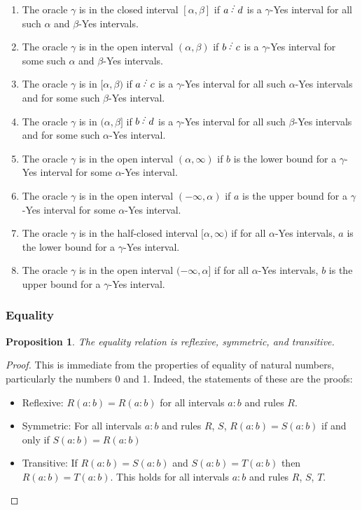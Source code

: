\documentclass[12pt]{article}
\newtheorem{proposition}{Proposition}[subsection]
\begin{document}
\begin{enumerate}
\item The oracle $\gamma$ is in the closed interval $[\alpha, \beta]$ if $a \lte  d$ is a $\gamma$-Yes interval for all such $\alpha$ and $\beta$-Yes intervals. 
\item The oracle $\gamma$ is in the open interval $(\alpha, \beta)$ if $b\lte c$ is a $\gamma$-Yes interval for some such $\alpha$ and $\beta$-Yes intervals. 
\item The oracle $\gamma$ is in $[\alpha, \beta)$ if $a\lte c$ is a $\gamma$-Yes interval for all such $\alpha$-Yes intervals and for some such $\beta$-Yes interval.
\item The oracle $\gamma$ is in $(\alpha, \beta]$ if $b\lte d$ is a $\gamma$-Yes interval for all such $\beta$-Yes intervals and for some such $\alpha$-Yes interval.
\item The oracle $\gamma$ is in the open interval $(\alpha, \infty)$ if $b$ is the lower bound for a $\gamma$-Yes interval for some $\alpha$-Yes interval. 
\item The oracle $\gamma$ is in the open interval $(-\infty, \alpha)$ if $a$ is the upper bound for a $\gamma$-Yes interval for some $\alpha$-Yes interval. 
\item The oracle $\gamma$ is in the half-closed interval $[\alpha, \infty)$ if for all $\alpha$-Yes intervals, $a$ is the lower bound for a $\gamma$-Yes interval. 
\item The oracle $\gamma$ is in the open interval $(-\infty, \alpha]$ if for all $\alpha$-Yes intervals, $b$ is the upper bound for a $\gamma$-Yes interval. 
\end{enumerate}



\subsubsection{Equality}\label{sec:eq}

\begin{proposition}\label{pr:reflexive}
The equality relation is reflexive, symmetric, and transitive. 
\end{proposition}

\begin{proof}
This is immediate from the properties of equality of natural numbers, particularly the numbers 0 and 1. Indeed, the statements of these are the proofs:
\begin{itemize}
    \item Reflexive: $R(a:b)=R(a:b)$ for all intervals $a:b$ and rules $R$.
    \item Symmetric: For all intervals $a:b$ and rules $R$, $S$, $R(a:b)=S(a:b)$ if and only if $S(a:b) = R(a:b)$ 
    \item Transitive: If $R(a:b)=S(a:b)$ and $S(a:b) = T(a:b)$ then $R(a:b)=T(a:b)$. This holds for all intervals $a:b$ and rules $R$, $S$, $T$.
\end{itemize}
\end{proof}
\end{document}
